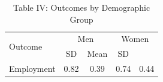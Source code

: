 \documentclass{article}
\begin{document}
\begin{table}[htbp]
\centering
\caption{Table IV: Outcomes by Demographic Group}
\begin{tabular}{lcccc}
\toprule
\multirow{2}{*}{Outcome} & \multicolumn{2}{c}{Men} & \multicolumn{2}{c}{Women} \\
Mean & SD & Mean & SD \\
\midrule
Employment & 0.82 & 0.39 & 0.74 & 0.44 \\
\bottomrule
\end{tabular}
\end{table}
\end{document}
